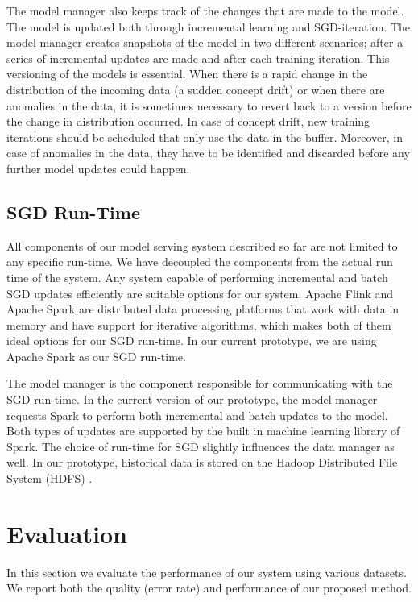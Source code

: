 \documentclass{vldb}
\begin{document}
The model manager also keeps track of the changes that are made to the model.
The model is updated both through incremental learning and SGD-iteration.
The model manager creates snapshots of the model in two different scenarios; after a series of incremental updates are made and after each training iteration.
This versioning of the models is essential.
When there is a rapid change in the distribution of the incoming data (a sudden concept drift) or when there are anomalies in the data, it is sometimes necessary to revert back to a version before the change in distribution occurred.
In case of concept drift, new training iterations should be scheduled that only use the data in the buffer.
Moreover, in case of anomalies in the data, they have to be identified and discarded before any further model updates could happen.

\subsection{SGD Run-Time} 
All components of our model serving system described so far are not limited to any specific run-time.
We have decoupled the components from the actual run time of the system.
Any system capable of performing incremental and batch SGD updates efficiently are suitable options for our system.
Apache Flink \cite{carbone2015apache} and Apache Spark \cite{zaharia2010spark} are distributed data processing platforms that work with data in memory and have support for iterative algorithms, which makes both of them ideal options for our SGD run-time.
In our current prototype, we are using Apache Spark \cite{zaharia2010spark} as our SGD run-time.

The model manager is the component responsible for communicating with the SGD run-time.
In the current version of our prototype, the model manager requests Spark to perform both incremental and batch updates to the model.
Both types of updates are supported by the built in machine learning library of Spark.
The choice of run-time for SGD slightly influences the data manager as well.
In our prototype, historical data is stored on the Hadoop Distributed File System (HDFS) \cite{shvachko2010hadoop}.

\section{Evaluation} \label{evaluation} 
In this section we evaluate the performance of our system using various datasets. 
We report both the quality (error rate) and performance of our proposed method. 
\end{document}
